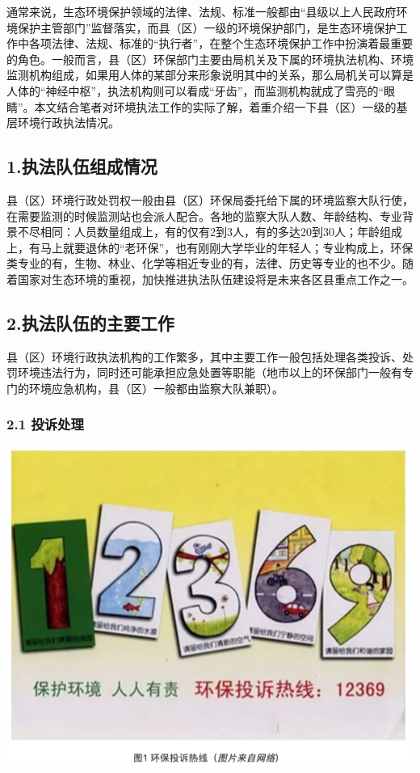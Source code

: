 \documentclass[]{book}
\begin{document}
通常来说，生态环境保护领域的法律、法规、标准一般都由``县级以上人民政府环境保护主管部门''监督落实，而县（区）一级的环境保护部门，是生态环境保护工作中各项法律、法规、标准的``执行者''，在整个生态环境保护工作中扮演着最重要的角色。一般而言，县（区）环保部门主要由局机关及下属的环境执法机构、环境监测机构组成，如果用人体的某部分来形象说明其中的关系，那么局机关可以算是人体的``神经中枢''，执法机构则可以看成``牙齿''，而监测机构就成了雪亮的``眼睛''。本文结合笔者对环境执法工作的实际了解，着重介绍一下县（区）一级的基层环境行政执法情况。

\hypertarget{ux6267ux6cd5ux961fux4f0dux7ec4ux6210ux60c5ux51b5}{%
\subsection{1.执法队伍组成情况}\label{ux6267ux6cd5ux961fux4f0dux7ec4ux6210ux60c5ux51b5}}

县（区）环境行政处罚权一般由县（区）环保局委托给下属的环境监察大队行使，在需要监测的时候监测站也会派人配合。各地的监察大队人数、年龄结构、专业背景不尽相同：人员数量组成上，有的仅有2到3人，有的多达20到30人；年龄组成上，有马上就要退休的``老环保''，也有刚刚大学毕业的年轻人；专业构成上，环保类专业的有，生物、林业、化学等相近专业的有，法律、历史等专业的也不少。随着国家对生态环境的重视，加快推进执法队伍建设将是未来各区县重点工作之一。

\hypertarget{ux6267ux6cd5ux961fux4f0dux7684ux4e3bux8981ux5de5ux4f5c}{%
\subsection{2.执法队伍的主要工作}\label{ux6267ux6cd5ux961fux4f0dux7684ux4e3bux8981ux5de5ux4f5c}}

县（区）环境行政执法机构的工作繁多，其中主要工作一般包括处理各类投诉、处罚环境违法行为，同时还可能承担应急处置等职能（地市以上的环保部门一般有专门的环境应急机构，县（区）一般都由监察大队兼职）。

\hypertarget{ux6295ux8bc9ux5904ux7406}{%
\subsubsection{2.1 投诉处理}\label{ux6295ux8bc9ux5904ux7406}}

\includegraphics[width=8.33in]{images/hjzf1}
\end{document}
